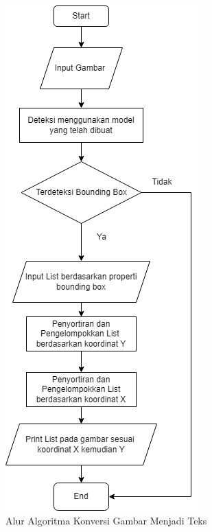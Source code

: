 \begin{figure}[!ht]
    \centering
    \includegraphics[scale=0.8]{gambar/model_deteksi.png}
    \caption{Alur Algoritma Konversi Gambar Menjadi Teks}
    \label{fig:aluralgoritmakonversi}
\end{figure}
\par

